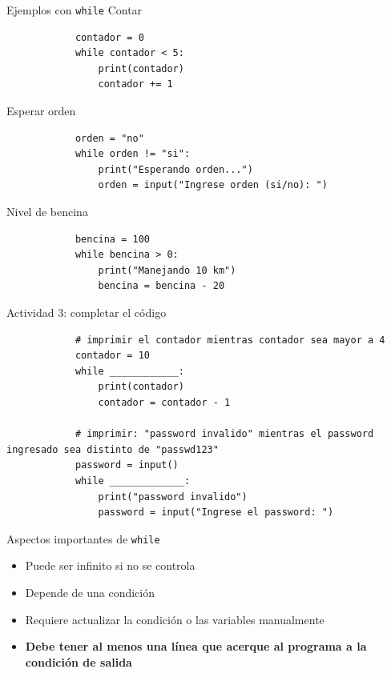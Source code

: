 \documentclass{beamer}
\begin{document}
    \begin{frame}[fragile,t]{Ejemplos con \texttt{while}}
        Contar
        \begin{verbatim}
            contador = 0
            while contador < 5:
                print(contador)
                contador += 1
        \end{verbatim}
        Esperar orden
        \begin{verbatim}
            orden = "no"
            while orden != "si":
                print("Esperando orden...")
                orden = input("Ingrese orden (si/no): ")
        \end{verbatim}
        Nivel de bencina
        \begin{verbatim}
            bencina = 100
            while bencina > 0:
                print("Manejando 10 km")
                bencina = bencina - 20
        \end{verbatim}
    \end{frame}

    \begin{frame}[fragile,t]{Actividad 3: completar el código}
        \begin{verbatim}
            # imprimir el contador mientras contador sea mayor a 4
            contador = 10
            while ____________:
                print(contador)
                contador = contador - 1
            
            # imprimir: "password invalido" mientras el password ingresado sea distinto de "passwd123" 
            password = input()
            while _____________:
                print("password invalido")
                password = input("Ingrese el password: ")
        \end{verbatim}
    \end{frame}

    \begin{frame}{Aspectos importantes de \texttt{while}}
        \begin{itemize}
            \item Puede ser infinito si no se controla
            \item Depende de una condición
            \item Requiere actualizar la condición o las variables manualmente
            \item \textbf{Debe tener al menos una línea que acerque al programa a la condición de salida}
        \end{itemize}
    \end{frame}
\end{document}
